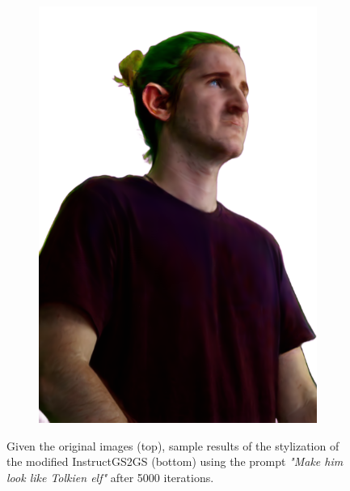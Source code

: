 \begin{figure}
\begin{subfigure}{0.18\linewidth}
        \includegraphics[width=\textwidth]{Figures/results/low/ephra_elf/21_render.png}
	\end{subfigure}
    \caption{Given the original images (top), sample results of the stylization of the modified InstructGS2GS (bottom) using the prompt \textit{"Make him look like Tolkien elf"} after 5000 iterations.}
    \label{fig:igs2gs_results}

\end{figure}


